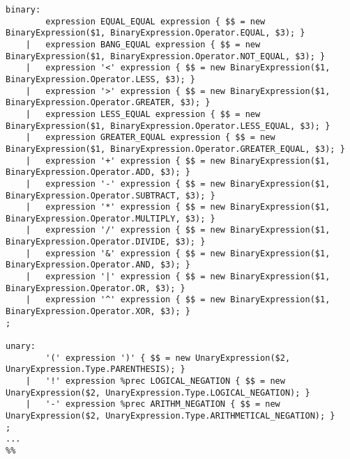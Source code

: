 \begin{lstlisting}[caption={Przykładowy fragment gramatyki definiowanej w języku uCricket}, label={lst:parser-gramatyka}]
binary:
        expression EQUAL_EQUAL expression { $$ = new BinaryExpression($1, BinaryExpression.Operator.EQUAL, $3); }
    |   expression BANG_EQUAL expression { $$ = new BinaryExpression($1, BinaryExpression.Operator.NOT_EQUAL, $3); }
    |   expression '<' expression { $$ = new BinaryExpression($1, BinaryExpression.Operator.LESS, $3); }
    |   expression '>' expression { $$ = new BinaryExpression($1, BinaryExpression.Operator.GREATER, $3); }
    |   expression LESS_EQUAL expression { $$ = new BinaryExpression($1, BinaryExpression.Operator.LESS_EQUAL, $3); }
    |   expression GREATER_EQUAL expression { $$ = new BinaryExpression($1, BinaryExpression.Operator.GREATER_EQUAL, $3); }
    |   expression '+' expression { $$ = new BinaryExpression($1, BinaryExpression.Operator.ADD, $3); }
    |   expression '-' expression { $$ = new BinaryExpression($1, BinaryExpression.Operator.SUBTRACT, $3); }
    |   expression '*' expression { $$ = new BinaryExpression($1, BinaryExpression.Operator.MULTIPLY, $3); }
    |   expression '/' expression { $$ = new BinaryExpression($1, BinaryExpression.Operator.DIVIDE, $3); }
    |   expression '&' expression { $$ = new BinaryExpression($1, BinaryExpression.Operator.AND, $3); }
    |   expression '|' expression { $$ = new BinaryExpression($1, BinaryExpression.Operator.OR, $3); }
    |   expression '^' expression { $$ = new BinaryExpression($1, BinaryExpression.Operator.XOR, $3); }
;

unary:
        '(' expression ')' { $$ = new UnaryExpression($2, UnaryExpression.Type.PARENTHESIS); }
    |   '!' expression %prec LOGICAL_NEGATION { $$ = new UnaryExpression($2, UnaryExpression.Type.LOGICAL_NEGATION); }
    |   '-' expression %prec ARITHM_NEGATION { $$ = new UnaryExpression($2, UnaryExpression.Type.ARITHMETICAL_NEGATION); }
;
...
%%
\end{lstlisting}


